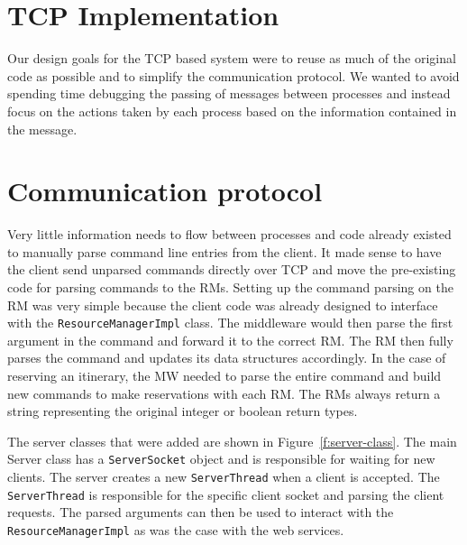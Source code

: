 \documentclass{article}
\newcommand{\includecode}[3]{}
\begin{document}
\includecode{example.java}{This code has several potential synchronization issues.}{l:ex}

\includecode{example-sync.java}{Almost the entire method body must be synchronized to prevent potential null pointer exceptions.}{l:ex-sync}


\includecode{example-sync-alt.java}{A potentially faster synchronization method that uses a mutex and allows the main computation to be synchronized only to the object being modified.}{l:ex-sync-alt}


  
\section{TCP Implementation} 

Our design goals for the TCP based system were to reuse as much of the original code as possible and to simplify the communication protocol. 
We wanted to avoid spending time debugging the passing of messages between processes and instead focus on the actions taken by each process based on the information contained in the message. 

\section{Communication protocol}
Very little information needs to flow between processes and code already existed to manually parse command line entries from the client. 
It made sense to have the client send unparsed commands directly over TCP and move the pre-existing code for parsing commands to the RMs. 
Setting up the command parsing on the RM was very simple because the client code was already designed to interface with the \texttt{ResourceManagerImpl} class.  
The middleware would then parse the first argument in the command and forward it to the correct RM. 
The RM then fully parses the command and updates its data structures accordingly. 
In the case of reserving an itinerary, the MW needed to parse the entire command and build new commands to make reservations with each RM. 
The RMs always return a string representing the original integer or boolean return types. 

The server classes that were added are shown in Figure~\ref{f:server-class}. The main Server class has a \texttt{ServerSocket} object and is responsible for waiting for new clients. The server creates a new \texttt{ServerThread} when a client is accepted. The \texttt{ServerThread} is responsible for the specific client socket and parsing the client requests. The parsed arguments can then be used to interact with the \texttt{ResourceManagerImpl} as was the case with the web services.
\end{document}

